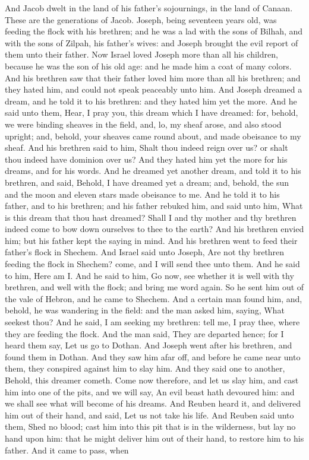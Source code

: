 And Jacob dwelt in the land of his father’s sojournings, in the land of Canaan. These are the generations of Jacob. Joseph, being seventeen years old, was feeding the flock with his brethren; and he was a lad with the sons of Bilhah, and with the sons of Zilpah, his father’s wives: and Joseph brought the evil report of them unto their father. Now Israel loved Joseph more than all his children, because he was the son of his old age: and he made him a coat of many colors. And his brethren saw that their father loved him more than all his brethren; and they hated him, and could not speak peaceably unto him.  And Joseph dreamed a dream, and he told it to his brethren: and they hated him yet the more. And he said unto them, Hear, I pray you, this dream which I have dreamed: for, behold, we were binding sheaves in the field, and, lo, my sheaf arose, and also stood upright; and, behold, your sheaves came round about, and made obeisance to my sheaf. And his brethren said to him, Shalt thou indeed reign over us? or shalt thou indeed have dominion over us? And they hated him yet the more for his dreams, and for his words. And he dreamed yet another dream, and told it to his brethren, and said, Behold, I have dreamed yet a dream; and, behold, the sun and the moon and eleven stars made obeisance to me. And he told it to his father, and to his brethren; and his father rebuked him, and said unto him, What is this dream that thou hast dreamed? Shall I and thy mother and thy brethren indeed come to bow down ourselves to thee to the earth? And his brethren envied him; but his father kept the saying in mind.  And his brethren went to feed their father’s flock in Shechem. And Israel said unto Joseph, Are not thy brethren feeding the flock in Shechem? come, and I will send thee unto them. And he said to him, Here am I. And he said to him, Go now, see whether it is well with thy brethren, and well with the flock; and bring me word again. So he sent him out of the vale of Hebron, and he came to Shechem. And a certain man found him, and, behold, he was wandering in the field: and the man asked him, saying, What seekest thou? And he said, I am seeking my brethren: tell me, I pray thee, where they are feeding the flock. And the man said, They are departed hence; for I heard them say, Let us go to Dothan. And Joseph went after his brethren, and found them in Dothan.  And they saw him afar off, and before he came near unto them, they conspired against him to slay him. And they said one to another, Behold, this dreamer cometh. Come now therefore, and let us slay him, and cast him into one of the pits, and we will say, An evil beast hath devoured him: and we shall see what will become of his dreams. And Reuben heard it, and delivered him out of their hand, and said, Let us not take his life. And Reuben said unto them, Shed no blood; cast him into this pit that is in the wilderness, but lay no hand upon him: that he might deliver him out of their hand, to restore him to his father. And it came to pass, when 